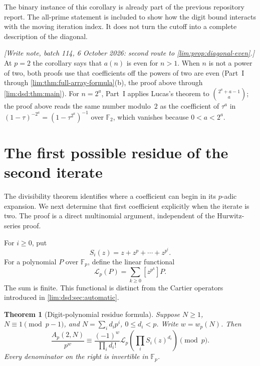 \documentclass[11pt]{article}
\newtheorem{theorem}{Theorem}[section]
\theoremstyle{definition}
\theoremstyle{remark}
\newcommand{\Ftwo}{\mathbb F_2}
\newcommand{\Fp}{\mathbb F_p}
\newcommand{\Lfun}{\mathcal L_p}
\begin{document}
The binary instance of this corollary is already part of the previous
repository report. The all-prime statement is included to show how
the digit bound interacts with the moving iteration index. It does
not turn the cutoff into a complete description of the diagonal.

\emph{[Write note, batch 114, 6 October 2026: second route to \cref{lim:prop:diagonal-even}.]} At
$p=2$ the corollary says that $a(n)$ is even for $n>1$. When $n$ is not a
power of two, both proofs use that coefficients off the powers of two are
even (Part~I through \cref{lim:thm:full-array-formula}(b), the proof above
through \cref{lim:dsd:thm:main}). For $n=2^a$, Part~I applies Lucas's
theorem to $\binom{2^a+a-1}{a}$; the proof above reads the same number
modulo~$2$ as the coefficient of $\tau^a$ in
$(1-\tau)^{-2^a}=(1-\tau^{2^a})^{-1}$ over $\Ftwo$, which vanishes because
$0<a<2^a$.

\section{The first possible residue of the second iterate}
\label{lim:dsd:sec:residue}

The divisibility theorem identifies where a coefficient can begin in
its $p$-adic expansion. We next determine that first coefficient
explicitly when the iterate is two. The proof is a direct multinomial
argument, independent of the Hurwitz-series proof.

For $i\ge0$, put
\begin{equation}
 S_i(z)=z+z^p+\cdots+z^{p^i}.
 \label{lim:dsd:eq:digit-polynomial}
\end{equation}
For a polynomial $P$ over $\Fp$, define the linear functional
\begin{equation}
 \Lfun(P)=\sum_{k\ge0}[z^{p^k}]P.
 \label{lim:dsd:eq:power-functional}
\end{equation}
The sum is finite. This functional is distinct from the Cartier
operators introduced in \cref{lim:dsd:sec:automatic}.

\begin{theorem}[Digit-polynomial residue formula]
\label{lim:dsd:thm:residue}
Suppose $N\ge1$, $N\equiv1\pmod{p-1}$, and
$N=\sum_i d_ip^i$, $0\le d_i<p$. Write $w=w_p(N)$. Then
\begin{equation}
 \boxed{\quad
 \frac{A_p(2,N)}{p^w}\equiv
 \frac{(-1)^w}{\prod_i d_i!}
 \Lfun\!\left(\prod_i S_i(z)^{d_i}\right)\pmod p.
 \quad}
 \label{lim:dsd:eq:residue}
\end{equation}
Every denominator on the right is invertible in $\Fp$.
\end{theorem}
\end{document}
